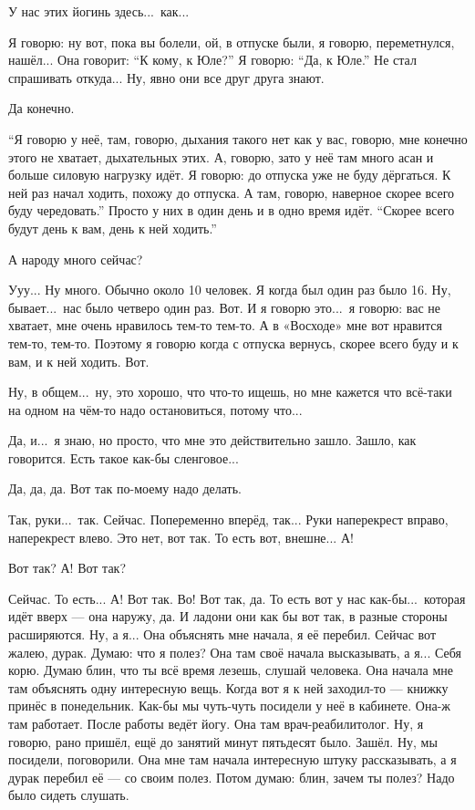\M
У нас этих йогинь здесь...\ как...

\I
Я говорю: ну вот, пока вы болели, ой, в отпуске были, я говорю, переметнулся, нашёл...
Она говорит: ``К кому, к Юле?''
Я говорю: ``Да, к Юле.''
Не стал спрашивать откуда...
Ну, явно они все друг друга знают.

\M
Да конечно.

\I
``Я говорю у неё, там, говорю, дыхания такого нет как у вас, говорю, мне конечно этого не
хватает, дыхательных этих.
А, говорю, зато у неё там много асан и больше
силовую нагрузку идёт. Я говорю: до отпуска уже не буду дёргаться.
К ней раз начал ходить, похожу до отпуска. А там, говорю, наверное скорее всего
буду чередовать.''
Просто у них в один день и в одно время идёт.
``Скорее всего будут день к вам, день к ней ходить.''

\M
А народу много сейчас?

\I
Ууу... Ну много. Обычно около 10 человек.
Я когда был один раз было 16.
Ну, бывает...\ нас было четверо один раз.
Вот. И я говорю это...\ я говорю: вас не хватает, мне очень нравилось тем-то тем-то.
А в «Восходе» мне вот нравится тем-то, тем-то. Поэтому я говорю когда
с отпуска вернусь,
скорее всего буду и к вам, и к ней ходить. Вот.

\M
Ну, в общем...\ ну, это хорошо, что что-то ищешь, но мне кажется что всё-таки на одном
на чём-то надо остановиться, потому что...

\I
Да, и...\ я знаю, но просто, что мне это действительно зашло.
Зашло, как говорится.
Есть такое как-бы сленговое...

\M
Да, да, да.
Вот так по-моему надо делать.

\I
Так, руки...\ так. Сейчас. Попеременно вперёд, так...
Руки наперекрест вправо, наперекрест влево. Это нет, вот так.
То есть вот, внешне... А!

\M
Вот так? А! Вот так?

\I
Сейчас.
То есть...
А! Вот так. Во! Вот
так, да. То есть вот у нас как-бы...\ которая идёт вверх --- она наружу, да.
И ладони они как бы вот так, в разные стороны расширяются.
Ну, а я... Она объяснять мне начала, я её перебил. Сейчас вот жалею, дурак.
Думаю: что я полез? Она там своё начала высказывать, а я... Себя корю.
Думаю блин, что ты всё время лезешь, слушай человека. Она начала мне там объяснять одну
интересную вещь. Когда вот я к ней заходил-то --- книжку принёс в понедельник.
Как-бы мы чуть-чуть посидели у неё в кабинете. Она-ж там работает. После работы
ведёт йогу. Она там врач-реабилитолог. Ну, я говорю, рано пришёл, ещё до занятий
минут пятьдесят было. Зашёл. Ну, мы посидели, поговорили. Она мне там начала интересную штуку
рассказывать, а я дурак перебил её --- со своим полез. Потом думаю: блин, зачем ты полез?
Надо было сидеть слушать.

